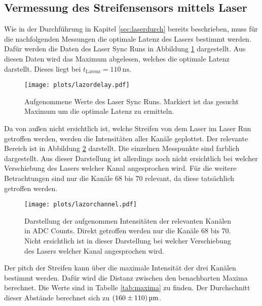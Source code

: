 \subsection{Vermessung des Streifensensors mittels Laser}

Wie in der Durchführung in Kapitel \ref{sec:laserdurch} bereits beschrieben, muss für die nachfolgenden Messungen die optimale Latenz des Lasers bestimmt werden.
Dafür werden die Daten des Laser Sync Runs in Abbildung \ref{fig:lazordelay} dargestellt.
Aus diesen Daten wird das Maximum abgelesen, welches die optimale Latenz darstellt.
Dieses liegt bei $t_\text{Latenz} = \SI{110}{\nano\second}$.

\begin{figure}[H]
  \centering
  \texttt{[image: plots/lazordelay.pdf]}
  \caption{Aufgenommene Werte des Laser Sync Runs. Markiert ist das gesucht Maximum um die optimale Latenz zu ermitteln.}
  \label{fig:lazordelay}
\end{figure}

Da von außen nicht ersichtlich ist, welche Streifen von dem Laser im Laser Run getroffen werden,
werden die Intensitäten aller Kanäle geplottet.
Der relevante Bereich ist in Abbildung \ref{fig:lazorchannel} darstellt.
Die einzelnen Messpunkte sind farblich dargestellt.
Aus dieser Darstellung ist allerdings noch nicht ersichtlich bei welcher Verschiebung des Lasers welcher Kanal angesprochen wird.
Für die weitere Betrachtungen sind nur die Kanäle 68 bis 70 relevant, da diese tatsächlich getroffen werden.

\begin{figure}[H]
  \centering
  \texttt{[image: plots/lazorchannel.pdf]}
  \caption{Darstellung der aufgenommen Intensitäten der relevanten Kanälen in ADC Counts. Direkt getroffen werden nur die Kanäle 68 bis 70. Nicht ersichtlich ist in dieser Darstellung bei welcher Verschiebung des Lasers welcher Kanal angesprochen wird.}
  \label{fig:lazorchannel}
\end{figure}

Der pitch der Streifen kann über die maximale Intensität der drei Kanälen bestimmt werden.
Dafür wird die Distanz zwischen den benachbarten Maxima berechnet.
Die Werte sind in Tabelle \ref{tab:maxima} zu finden.
Der Durchschnitt dieser Abstände berechnet sich zu $\SI{160 \pm 110}{\micro\metre}$.

